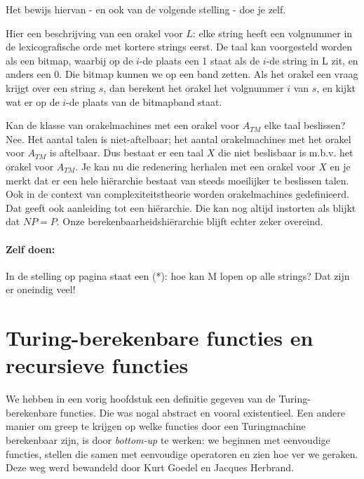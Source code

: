 Het bewijs hiervan - en ook van de volgende stelling - doe je zelf.



Hier een beschrijving van een orakel voor $L$: elke string heeft een
volgnummer in de lexicografische orde met kortere strings eerst. De
taal kan voorgesteld worden als een bitmap, waarbij op de $i$-de
plaats een 1 staat als de $i$-de string in L zit, en anders een 0. Die
bitmap kunnen we op een band zetten. Als het orakel een vraag krijgt
over een string $s$, dan berekent het orakel het volgnummer $i$ van
$s$, en kijkt wat er op de $i$-de plaats van de bitmapband staat.  

Kan de klasse van orakelmachines met een orakel voor $A_{TM}$ elke
taal beslissen? Nee. Het aantal talen is niet-aftelbaar; het aantal
orakelmachines met het orakel voor $A_{TM}$ is aftelbaar. Dus bestaat
er een taal $X$ die niet beslisbaar is m.b.v. het orakel voor
$A_{TM}$. Je kan nu die redenering herhalen met een orakel voor $X$ en
je merkt dat er een hele hi\"erarchie bestaat van steeds moeilijker te
beslissen talen. Ook in de context van complexiteitstheorie worden
orakelmachines gedefinieerd. Dat geeft ook aanleiding tot een
hi\"erarchie. Die kan nog altijd instorten als blijkt dat $NP = P$. Onze
berekenbaarheidshi\"erarchie blijft echter zeker overeind.

\paragraph{Zelf doen:} In de stelling op pagina \pageref{allestrings}
staat een (*): hoe kan M lopen op alle strings? Dat zijn er oneindig veel!




\section{Turing-berekenbare functies en recursieve functies}

We hebben in een vorig hoofdstuk een definitie gegeven van de
Turing-berekenbare functies. Die was nogal abstract en vooral
existentieel. Een andere manier om greep te krijgen op welke functies
door een Turingmachine berekenbaar zijn, is door {\em bottom-up} te
werken: we beginnen met eenvoudige functies, stellen die samen met
eenvoudige operatoren en zien hoe ver we geraken. Deze weg werd
bewandeld door Kurt Goedel en Jacques Herbrand.




